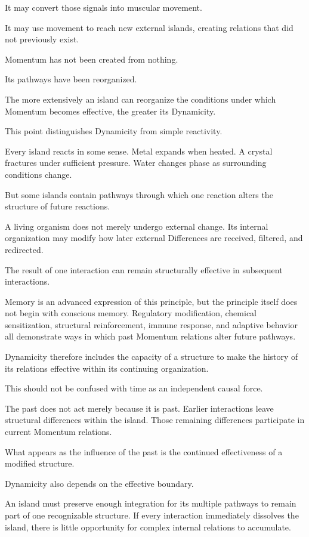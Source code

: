 It may convert those signals into muscular movement.

It may use movement to reach new external islands, creating relations that did not previously exist.

Momentum has not been created from nothing.

Its pathways have been reorganized.

The more extensively an island can reorganize the conditions under which Momentum becomes effective, the greater its Dynamicity.

This point distinguishes Dynamicity from simple reactivity.

Every island reacts in some sense. Metal expands when heated. A crystal fractures under sufficient pressure. Water changes phase as surrounding conditions change.

But some islands contain pathways through which one reaction alters the structure of future reactions.

A living organism does not merely undergo external change. Its internal organization may modify how later external Differences are received, filtered, and redirected.

The result of one interaction can remain structurally effective in subsequent interactions.

Memory is an advanced expression of this principle, but the principle itself does not begin with conscious memory. Regulatory modification, chemical sensitization, structural reinforcement, immune response, and adaptive behavior all demonstrate ways in which past Momentum relations alter future pathways.

Dynamicity therefore includes the capacity of a structure to make the history of its relations effective within its continuing organization.

This should not be confused with time as an independent causal force.

The past does not act merely because it is past. Earlier interactions leave structural differences within the island. Those remaining differences participate in current Momentum relations.

What appears as the influence of the past is the continued effectiveness of a modified structure.

Dynamicity also depends on the effective boundary.

An island must preserve enough integration for its multiple pathways to remain part of one recognizable structure. If every interaction immediately dissolves the island, there is little opportunity for complex internal relations to accumulate.

